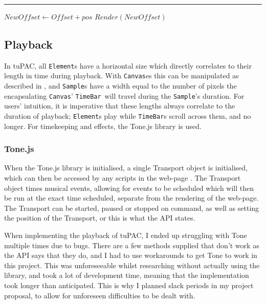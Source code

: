 \documentclass[12pt,a4paper,oneside,openright]{report}
\newcommand{\element}{\texttt{Element}}
\newcommand{\canvas}{\texttt{Canvas}}
\newcommand{\timebar}{\texttt{TimeBar}}
\newcommand{\sample}{\texttt{Sample}}
\begin{document}
\begin{algorithm}
\DontPrintSemicolon
{}
\vspace{1mm} \hrule \vspace{1mm}
\nl $NewOffset \gets Offset + pos$\;
\nl $Render(NewOffset)$\;
\nl {}
\caption{Outline of \texttt{draw} function in \element\ classes.}\label{alg:draw}
\end{algorithm}


\subsection{Playback}\label{sec:playback}
In tuPAC, all \element s have a horizontal size which directly correlates to their length in time during playback. With \canvas es this can be manipulated as described in , and \sample s have a width equal to the number of pixels the encapsulating \canvas' \timebar\ will travel during the \sample's duration. For users' intuition, it is imperative that these lengths always correlate to the duration of playback; \element s play while \timebar s scroll across them, and no longer. For timekeeping and effects, the Tone.js library is used.

\subsubsection{Tone.js}
When the Tone.js library is initialised, a single Transport object is initialised, which can then be accessed by any scripts in the web-page \cite{Transport}. The Transport object times musical events, allowing for events to be scheduled which will then be run at the exact time scheduled, separate from the rendering of the web-page. The Transport can be started, paused or stopped on command, as well as setting the position of the Transport, or this is what the API states.

When implementing the playback of tuPAC, I ended up struggling with Tone multiple times due to bugs. There are a few methods supplied that don't work as the API says that they do, and I had to use workarounds to get Tone to work in this project. This was unforeseeable whilst researching without actually using the library, and took a lot of development time, meaning that the implementation took longer than anticipated. This is why I planned slack periods in my project proposal, to allow for unforeseen difficulties to be dealt with.
\end{document}
